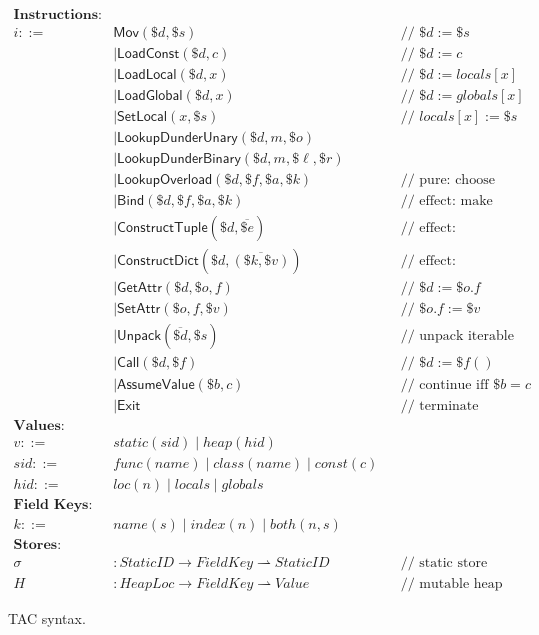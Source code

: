 \begin{figure}[t]
\centering
\[
\begin{aligned}
\textbf{Instructions:} && \\
i ::= \;& \mathsf{Mov}(\$d, \$s) && \text{// } \$d := \$s \\
      &\mid \mathsf{LoadConst}(\$d, c) && \text{// } \$d := c \\
      &\mid \mathsf{LoadLocal}(\$d, x) && \text{// } \$d := \mathit{locals}[x] \\
      &\mid \mathsf{LoadGlobal}(\$d, x) && \text{// } \$d := \mathit{globals}[x] \\
      &\mid \mathsf{SetLocal}(x, \$s) && \text{// } \mathit{locals}[x] := \$s \\[0.5ex]
      &\mid \mathsf{LookupDunderUnary}(\$d, m, \$o) \\
      &\mid \mathsf{LookupDunderBinary}(\$d, m, \$\ell, \$r) \\
      &\mid \mathsf{LookupOverload}(\$d, \$f, \$a, \$k) && \text{// pure: choose static target} \\
      &\mid \mathsf{Bind}(\$d, \$f, \$a, \$k) && \text{// effect: make bound callable} \\
      &\mid \mathsf{ConstructTuple}(\$d, \overline{\$e}) && \text{// effect: allocate/populate tuple} \\
      &\mid \mathsf{ConstructDict}(\$d, \overline{(\$k, \$v)}) && \text{// effect: allocate/populate dict} \\[0.5ex]
      &\mid \mathsf{GetAttr}(\$d, \$o, f) && \text{// } \$d := \$o.f \\
      &\mid \mathsf{SetAttr}(\$o, f, \$v) && \text{// } \$o.f := \$v \\
      &\mid \mathsf{Unpack}(\overline{\$d}, \$s) && \text{// unpack iterable} \\
      &\mid \mathsf{Call}(\$d, \$f) && \text{// } \$d := \$f() \\[0.5ex]
      &\mid \mathsf{AssumeValue}(\$b, c) && \text{// continue iff } \$b = c \\
      &\mid \mathsf{Exit} && \text{// terminate} \\[1ex]
\textbf{Values:} && \\
v ::= \;& \mathit{static}(sid) \mid \mathit{heap}(hid) \\[0.5ex]
sid ::= \;& \mathit{func}(name) \mid \mathit{class}(name) \mid \mathit{const}(c) \\
hid ::= \;& \mathit{loc}(n) \mid \mathit{locals} \mid \mathit{globals} \\[1ex]
\textbf{Field Keys:} && \\
k ::= \;& \mathit{name}(s) \mid \mathit{index}(n) \mid \mathit{both}(n, s) \\[1ex]
\textbf{Stores:} && \\
\sigma &: \mathit{StaticID} \to \mathit{FieldKey} \rightharpoonup \mathit{StaticID} && \text{// static store (closed)} \\
H &: \mathit{HeapLoc} \to \mathit{FieldKey} \rightharpoonup \mathit{Value} && \text{// mutable heap}
\end{aligned}
\]
\caption{TAC syntax.}
\label{fig:tac-syntax}
\end{figure}

